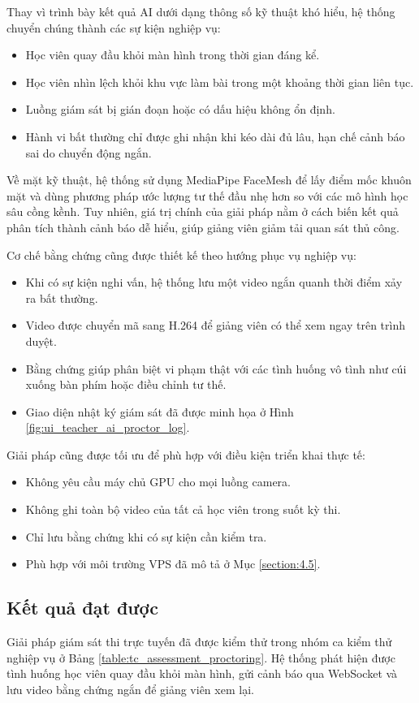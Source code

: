 \documentclass[../DoAn.tex]{subfiles}
\begin{document}
Thay vì trình bày kết quả AI dưới dạng thông số kỹ thuật khó hiểu, hệ thống chuyển chúng thành các sự kiện nghiệp vụ:
\begin{itemize}
    \item Học viên quay đầu khỏi màn hình trong thời gian đáng kể.
    \item Học viên nhìn lệch khỏi khu vực làm bài trong một khoảng thời gian liên tục.
    \item Luồng giám sát bị gián đoạn hoặc có dấu hiệu không ổn định.
    \item Hành vi bất thường chỉ được ghi nhận khi kéo dài đủ lâu, hạn chế cảnh báo sai do chuyển động ngắn.
\end{itemize}

Về mặt kỹ thuật, hệ thống sử dụng MediaPipe FaceMesh \cite{Lugaresi2019MediaPipe} để lấy điểm mốc khuôn mặt và dùng phương pháp ước lượng tư thế đầu nhẹ hơn so với các mô hình học sâu cồng kềnh. Tuy nhiên, giá trị chính của giải pháp nằm ở cách biến kết quả phân tích thành cảnh báo dễ hiểu, giúp giảng viên giảm tải quan sát thủ công.

Cơ chế bằng chứng cũng được thiết kế theo hướng phục vụ nghiệp vụ:
\begin{itemize}
    \item Khi có sự kiện nghi vấn, hệ thống lưu một video ngắn quanh thời điểm xảy ra bất thường.
    \item Video được chuyển mã sang H.264 để giảng viên có thể xem ngay trên trình duyệt.
    \item Bằng chứng giúp phân biệt vi phạm thật với các tình huống vô tình như cúi xuống bàn phím hoặc điều chỉnh tư thế.
    \item Giao diện nhật ký giám sát đã được minh họa ở Hình \ref{fig:ui_teacher_ai_proctor_log}.
\end{itemize}

Giải pháp cũng được tối ưu để phù hợp với điều kiện triển khai thực tế:
\begin{itemize}
    \item Không yêu cầu máy chủ GPU cho mọi luồng camera.
    \item Không ghi toàn bộ video của tất cả học viên trong suốt kỳ thi.
    \item Chỉ lưu bằng chứng khi có sự kiện cần kiểm tra.
    \item Phù hợp với môi trường VPS đã mô tả ở Mục \ref{section:4.5}.
\end{itemize}

\subsection{Kết quả đạt được}
Giải pháp giám sát thi trực tuyến đã được kiểm thử trong nhóm ca kiểm thử nghiệp vụ ở Bảng \ref{table:tc_assessment_proctoring}. Hệ thống phát hiện được tình huống học viên quay đầu khỏi màn hình, gửi cảnh báo qua WebSocket và lưu video bằng chứng ngắn để giảng viên xem lại.
\end{document}
